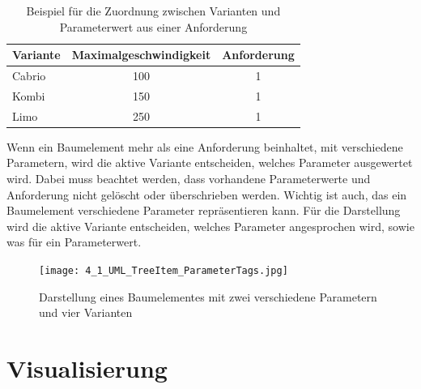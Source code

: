 \begin{table}[h]
\begin{center}
	\begin{tabular}{|l||c|c|}
	 \hline
	 Variante &Maximalgeschwindigkeit &Anforderung\\
	 \hline\hline
	 Cabrio   &100                      & 1\\
	 \hline
	 Kombi    &150                      & 1\\
	 \hline
	 Limo     &250                      & 1\\
	 \hline
	\end{tabular}
	
	\caption{Beispiel für die Zuordnung zwischen Varianten und Parameterwert aus einer Anforderung}
	\label{table:4TestCases}
\end{center}
\end{table}

Wenn ein Baumelement mehr als eine Anforderung beinhaltet, mit verschiedene Parametern, wird die aktive Variante entscheiden, welches Parameter ausgewertet wird. Dabei muss beachtet werden, dass vorhandene Parameterwerte und Anforderung nicht gelöscht oder überschrieben werden. Wichtig ist auch, das ein Baumelement verschiedene Parameter repräsentieren kann. Für die Darstellung wird die aktive Variante entscheiden, welches Parameter angesprochen wird, sowie was für ein Parameterwert.\\

\begin{figure}[h!]
  \begin{center}
    \texttt{[image: 4\_1\_UML\_TreeItem\_ParameterTags.jpg]}
  		  \caption{Darstellung eines Baumelementes mit zwei verschiedene Parametern und vier Varianten}
     \label{ttn.treeitem_vars}
  \end{center}
\end{figure}

\newpage
\section{Visualisierung}\label{sec.visialisierung}
\paragraph{}

